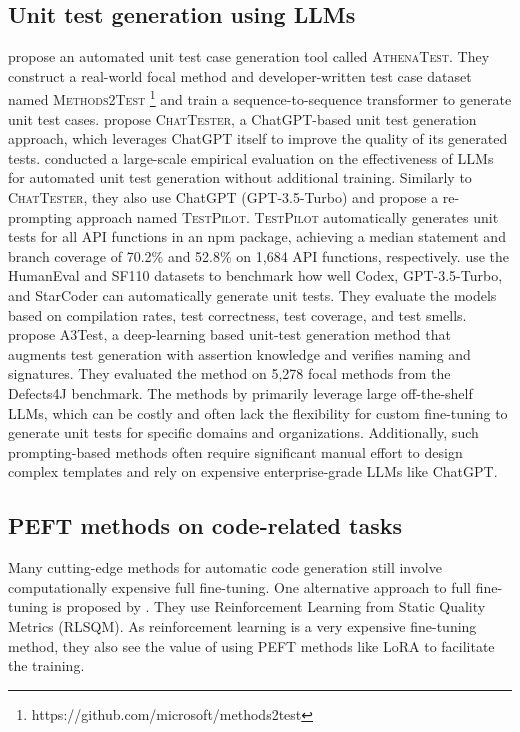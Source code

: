 \documentclass[12pt]{book}
\begin{document}
\subsection{Unit test generation using LLMs}
\citet{tufano2021unit} propose an automated unit test case generation tool called \textsc{AthenaTest}. They construct a real-world focal method and developer-written test case dataset named \textsc{Methods2Test} \footnote{ https://github.com/microsoft/methods2test} and train a sequence-to-sequence transformer to generate unit test cases.
\citet{yuan2023manual} propose \textsc{ChatTester}, a ChatGPT-based unit test generation approach, which leverages ChatGPT itself to improve the quality of its generated tests. \citet{schäfer2023empirical} conducted a large-scale empirical evaluation on the effectiveness of LLMs for automated unit test generation without additional training. Similarly to \textsc{ChatTester}, they also use ChatGPT (GPT-3.5-Turbo) and propose a re-prompting approach named \textsc{TestPilot}. \textsc{TestPilot} automatically generates unit tests for all API functions in an npm package, achieving a median statement and branch coverage of 70.2\% and 52.8\% on 1,684 API functions, respectively. \citet{siddiq2024using} use the HumanEval and SF110 datasets to benchmark how well Codex, GPT-3.5-Turbo, and StarCoder can automatically generate unit tests. They evaluate the models based on compilation rates, test correctness, test coverage, and test smells. \citet{alagarsamy2024a3test} propose A3Test, a deep-learning based unit-test generation method that augments test generation with assertion knowledge and verifies naming and signatures. They evaluated the method on 5,278 focal methods from the Defects4J \citep{just2014defects4j} benchmark. The methods by \citet{yuan2023manual, siddiq2024using, schäfer2023empirical, alagarsamy2024a3test} primarily leverage large off-the-shelf LLMs, which can be costly and often lack the flexibility for custom fine-tuning to generate unit tests for specific domains and organizations. Additionally, such prompting-based methods often require significant manual effort to design complex templates and rely on expensive enterprise-grade LLMs like ChatGPT. 

\subsection{PEFT methods on code-related tasks}
Many cutting-edge methods for automatic code generation still involve computationally expensive full fine-tuning. One alternative approach to full fine-tuning is proposed by \citet{steenhoek2023reinforcement}. They use Reinforcement Learning from Static Quality Metrics (RLSQM). As reinforcement learning is a very expensive fine-tuning method, they also see the value of using PEFT methods like LoRA to facilitate the training.
\end{document}
